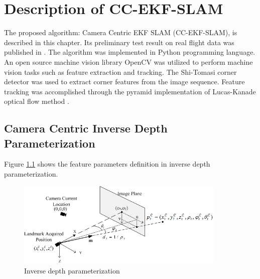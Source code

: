\chapter{Description of CC-EKF-SLAM}\label{ch:algorithm}

The proposed algorithm: Camera Centric EKF SLAM (CC-EKF-SLAM), is
described in this chapter. Its preliminary test result on real flight
data was published in \cite{zhang_obstacle_2012}. The algorithm was
implemented in Python programming language\cite{_python_????}. An open
source machine vision library OpenCV\cite{_opencv_????} was utilized
to perform machine vision tasks such as feature extraction and
tracking. The Shi-Tomasi corner detector \cite{shi_good_1994} was used
to extract corner features from the image sequence. Feature tracking
was accomplished through the pyramid implementation of Lucas-Kanade
optical flow method \cite{bouguet_pyramidal_1999}.

\section{Camera Centric Inverse Depth Parameterization}
Figure \ref{fig:algo1} shows the feature parameters definition in inverse
depth parameterization.

\begin{figure}[h]
\centering
\includegraphics[width=10cm, keepaspectratio=true]{./Figures/idp.jpg}
\caption{Inverse depth parameterization}
\label{fig:algo1}
\end{figure}

